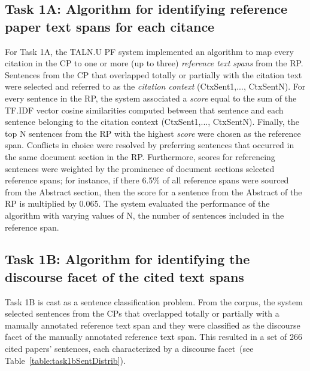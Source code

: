 \documentclass[11pt]{article}
\begin{document}
\subsection{Task 1A: Algorithm for identifying reference paper 
  text spans for each citance}
For Task 1A, the TALN.U	PF system implemented an algorithm to 
map every citation in the CP to one or more (up to three) 
\textit{reference text spans} from the RP. Sentences from the CP 
that overlapped totally or partially with the citation text were 
selected and referred to as the \textit{citation context} 
(CtxSent1,..., CtxSentN). For every sentence in the RP, the system 
associated a \textit{score} equal to the sum of the TF.IDF vector 
cosine similarities computed between that sentence and each sentence 
belonging to the citation context (CtxSent1,..., CtxSentN). Finally, 
the top N sentences from the RP with the highest \textit{score} were 
chosen as the reference span. Conflicts in choice were resolved by 
preferring sentences that occurred in the same document section in 
the RP. 
Furthermore, scores for referencing sentences were weighted 
by the prominence of document sections selected reference spans; 
for instance, if there 6.5\% of all reference spans were sourced from the
Abstract section, then the score for a sentence from the Abstract 
of the RP is multiplied by 0.065. The system evaluated the performance 
of the algorithm with varying values of N, the number of sentences 
included in the reference span.

\subsection{Task 1B: Algorithm for identifying the discourse facet 
  of the cited text spans}
Task 1B is cast as a sentence classification problem. From the 
corpus, the system selected sentences from the CPs that overlapped 
totally or partially with a manually annotated reference text span 
and they were classified as the discourse facet of the manually 
annotated reference text span. This resulted in a set of 266 cited 
papers' sentences, each characterized by a discourse 
facet~(see Table~\ref{table:task1bSentDistrib}).
\end{document}
